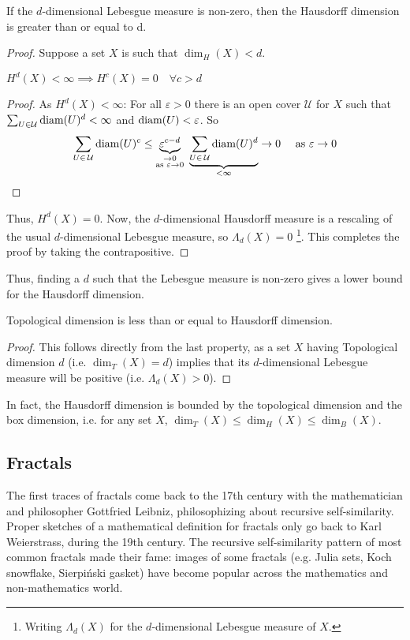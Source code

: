 \begin{lemma}
	If the $d$-dimensional Lebesgue measure is non-zero, then the Hausdorff dimension is greater than or equal to d.
\end{lemma}
\begin{proof}
	Suppose a set $X$ is such that $\dim_H(X)<d$.
	\begin{claim}\label{propr:Hausdorff_jump}
		$H^d(X) < \infty \implies H^c(X) = 0 \quad \forall c > d$
	\end{claim}
	\begin{proof}
		As $H^d(X) < \infty$: For all $\varepsilon > 0$ there is an open cover $\mathcal{U}$ for $X$ such that $\sum_{U \in \mathcal{U}} \text{diam}(U)^d < \infty$ and $\text{diam}(U) < \varepsilon$.
		So
		$$\sum_{U \in \, \mathcal{U}} \diam{U}^c \leq
		\underbrace{\varepsilon^{c-d}}_{\substack{\to 0\\\text{as } \varepsilon \to 0}} \ 
		\underbrace{\sum_{U \in \, \mathcal{U}} \diam{U}^d}_{< \infty}
		\to 0 \quad \text{ as } \varepsilon \to 0
		$$
	\end{proof}
	Thus, $H^d(X) = 0$.
	Now, the $d$-dimensional Hausdorff measure is a rescaling of the usual $d$-dimensional Lebesgue measure, so $\Lambda_d(X) = 0$ \footnote{Writing $\Lambda_d(X)$ for the $d$-dimensional Lebesgue measure of $X$.}.
	This completes the proof by taking the contrapositive.
\end{proof}

Thus, finding a $d$ such that the Lebesgue measure is non-zero gives a lower bound for the Hausdorff dimension.

\begin{property}
	Topological dimension is less than or equal to Hausdorff dimension.
\end{property}
\begin{proof}
	This follows directly from the last property, as a set $X$ having Topological dimension $d$ (i.e. $\dim_T(X) = d$) implies that its $d$-dimensional Lebesgue measure will be positive (i.e. $\Lambda_d(X) > 0$).
\end{proof}

In fact, the Hausdorff dimension is bounded by the topological dimension and the box dimension, i.e. for any set $X$, $\dim_T(X) \leq \dim_H(X) \leq \dim_B(X)$.

\subsection{Fractals}
The first traces of fractals come back to the 17th century with the mathematician and philosopher Gottfried Leibniz, philosophizing about recursive self-similarity.
Proper sketches of a mathematical definition for fractals only go back to Karl Weierstrass, during the 19th century.
The recursive self-similarity pattern of most common fractals made their fame:
images of some fractals (e.g. Julia sets, Koch snowflake, Sierpiński gasket) have become popular across the mathematics and non-mathematics world.


